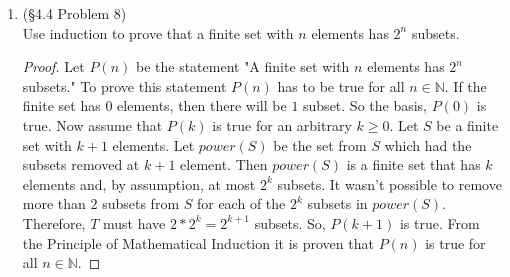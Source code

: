 \documentclass[12pt]{article}
\newcommand{\NN}{\mathbb{N}}
\begin{document}
\begin{enumerate}
\item (\S4.4 Problem 8)\\
Use induction to prove that a finite set with $n$ elements has $2^n$ subsets.
\begin{proof}
\hfill \break 
Let $P(n)$ be the statement "A finite set with $n$ elements has $2^n$ subsets." To prove this statement $P(n)$ has to be true for all $n \in \NN$. If the finite set has $0$ elements, then there will be $1$ subset. So the basis, $P(0)$ is true. Now assume that $P(k)$ is true for an arbitrary $k \geq 0$. Let $S$ be a finite set with $k+1$ elements. Let $power(S)$ be the set from $S$ which had the subsets removed at $k+1$ element. Then $power(S)$ is a finite set that has $k$ elements and, by assumption, at most $2^k$ subsets. It wasn't possible to remove more than $2$ subsets from $S$ for each of the $2^k$ subsets in $power(S)$. Therefore, $T$ must have $2 * 2^k = 2^{k+1}$ subsets. So, $P(k+1)$ is true. From the Principle of Mathematical Induction it is proven that $P(n)$ is true for all $n \in \NN$.


\end{proof}


\end{enumerate}
\end{document}
